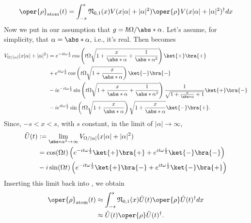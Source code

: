 \begin{equation}
    \label{eq:appen_JCM_rho_atom_t}
    \begin{aligned}
        \oper{\rho}_{\text{atom}}(t)= \int_{-s}^{s} \mathfrak{N}_{0, 1}(x) V(x|\alpha| + |\alpha|^2) 
    \oper{\rho} V(x|\alpha| + |\alpha|^2)^{\dagger} dx
    \end{aligned}
\end{equation}
Now we put in our assumption that \(g = \hbar\Omega / \abs*{\alpha}\). Let's assume, 
for simplicity, that \(\alpha = \abs*{\alpha}\), i.e., it's real. Then  becomes
\begin{align}
    V_{\Omega/|\alpha|}(x|\alpha| + |\alpha|^2) 
    &= e^{-i t \omega \frac{1}{2}}\cos \left( t\Omega \sqrt{1 + \frac{x}{\abs*{\alpha}}+ \frac{1}{\abs*{\alpha}^2}} \right) \ket{+}\bra{+} \nonumber \\
    &+ e^{i t \omega \frac{1}{2} }\cos \left( t\Omega \sqrt{1 + \frac{x}{\abs*{\alpha}}} \right) \ket{-}\bra{-} \nonumber \\
    &- i e^{-i t \omega \frac{1}{2} }\sin \left( t\Omega \sqrt{1 + \frac{x}{\abs*{\alpha}} + \frac{1}{\abs*{\alpha}^2}} \right) \frac{1}{\sqrt{1 + \frac{x}{\abs*{\alpha}} + 1}} \ket{+}\bra{-} \nonumber \\
    &- i e^{i t \omega \frac{1}{2}} \sin \left( t\Omega \sqrt{1 + \frac{x}{\abs*{\alpha}}} \right) \sqrt{1 + \frac{x}{\abs*{\alpha}}} \ket{-}\bra{+}. \nonumber
\end{align}
Since, \(-s < x < s\), with \(s\) constant, in the limit of \(|\alpha| \to \infty\),
\begin{align}
        \label{eq:appen_JCM_V_g_limit}
    \tilde{U}(t) &:= \lim_{\abs*{\alpha}^2 \to \infty} 
    V_{\Omega/|\alpha|}(x|\alpha| + |\alpha|^2)  \nonumber \\
    &= \cos(\Omega t) \left(e^{-i t \omega \frac{1}{2}}\ket{+}\bra{+} + 
    e^{i t \omega \frac{1}{2}}\ket{-}\bra{-} \right)  \nonumber \\
    &- i \sin(\Omega t)
     \left( e^{-i t \omega \frac{1}{2}}\ket{+}\bra{-}
    + e^{i t \omega \frac{1}{2}}\ket{-}\bra{+}\right)  \nonumber \\
\end{align}
Inserting this limit back into , we obtain
\begin{align}
    \oper{\rho}_{\text{atom}}(t) &\approx \int_{-s}^{s} \mathfrak{N}_{0, 1}(x) \tilde{U}(t) \oper{\rho} \tilde{U}(t)^{\dagger} dx \nonumber\\
        &\approx \tilde{U}(t) \oper{\rho} \tilde{U}(t)^{\dagger}.
\end{align}

